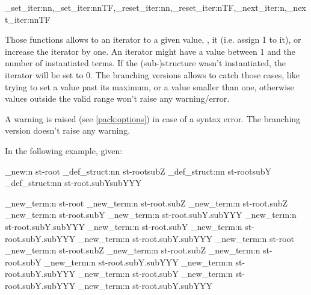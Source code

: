 \documentclass[10pt]{article}
\begin{document}
\begin{codedescribe}[code,update=2026/02/01]{\starray_set_iter:nn,\starray_set_iter:nnTF,\starray_reset_iter:nn,\starray_reset_iter:nTF,\starray_next_iter:n,\starray_next_iter:nnTF}
\begin{codesyntax}%
\end{codesyntax}
Those functions allows to  an iterator to a given value, ,  it (i.e. assign 1 to it), or increase the iterator by one. An iterator might have a value between 1 and the number of instantiated terms. If the (sub-)structure wasn't instantiated, the iterator will be set to 0. The branching versions allows to catch those cases, like trying to set a value past its maximum, or a value smaller than one, otherwise values outside the valid range won't raise any warning/error.
\end{codedescribe}

\begin{tsremark}
A warning is raised (see \ref{pack:options}) in case of a  syntax error. The branching version doesn't raise any warning.
\end{tsremark}

In the following example, given:

\begin{codestore}[demo7]
\starray_new:n {st-root}
\starray_def_struct:nn {st-root}{subZ}
\starray_def_struct:nn {st-root}{subY}
\starray_def_struct:nn {st-root.subY}{subYYY}
\end{codestore}

\begin{codestore}[demo7]
\starray_new_term:n {st-root}
\starray_new_term:n {st-root.subZ}
\starray_new_term:n {st-root.subZ}
\starray_new_term:n {st-root.subY}
\starray_new_term:n {st-root.subY.subYYY}
\starray_new_term:n {st-root.subY.subYYY}
\starray_new_term:n {st-root.subY}
\starray_new_term:n {st-root.subY.subYYY}
\starray_new_term:n {st-root.subY.subYYY}
\starray_new_term:n {st-root}
\starray_new_term:n {st-root.subZ}
\starray_new_term:n {st-root.subZ}
\starray_new_term:n {st-root.subY}
\starray_new_term:n {st-root.subY.subYYY}
\starray_new_term:n {st-root.subY.subYYY}
\starray_new_term:n {st-root.subY}
\starray_new_term:n {st-root.subY.subYYY}
\starray_new_term:n {st-root.subY.subYYY}
\end{codestore}
\end{document}
